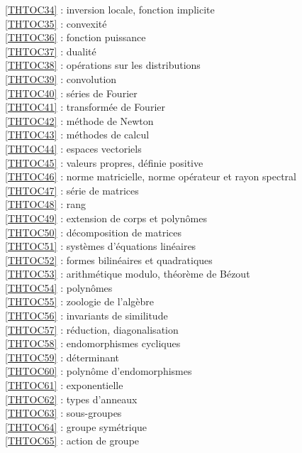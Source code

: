\ref {THTOC34} : inversion locale, fonction implicite\\
\ref {THTOC35} : convexité\\
\ref {THTOC36} : fonction puissance\\
\ref {THTOC37} : dualité\\
\ref {THTOC38} : opérations sur les distributions\\
\ref {THTOC39} : convolution\\
\ref {THTOC40} : séries de Fourier\\
\ref {THTOC41} : transformée de Fourier\\
\ref {THTOC42} : méthode de Newton\\
\ref {THTOC43} : méthodes de calcul\\
\ref {THTOC44} : espaces vectoriels\\
\ref {THTOC45} : valeurs propres, définie positive\\
\ref {THTOC46} : norme matricielle, norme opérateur et rayon spectral\\
\ref {THTOC47} : série de matrices\\
\ref {THTOC48} : rang\\
\ref {THTOC49} : extension de corps et polynômes\\
\ref {THTOC50} : décomposition de matrices\\
\ref {THTOC51} : systèmes d'équations linéaires\\
\ref {THTOC52} : formes bilinéaires et quadratiques\\
\ref {THTOC53} : arithmétique modulo, théorème de Bézout\\
\ref {THTOC54} : polynômes\\
\ref {THTOC55} : zoologie de l'algèbre\\
\ref {THTOC56} : invariants de similitude\\
\ref {THTOC57} : réduction, diagonalisation\\
\ref {THTOC58} : endomorphismes cycliques\\
\ref {THTOC59} : déterminant\\
\ref {THTOC60} : polynôme d'endomorphismes\\
\ref {THTOC61} : exponentielle\\
\ref {THTOC62} : types d'anneaux\\
\ref {THTOC63} : sous-groupes\\
\ref {THTOC64} : groupe symétrique\\
\ref {THTOC65} : action de groupe\\

